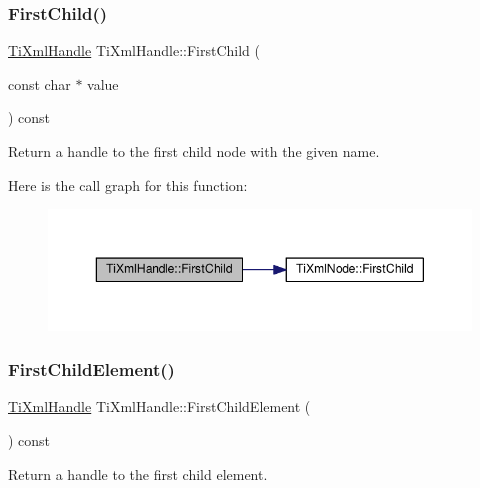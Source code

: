 \subsubsection{\texorpdfstring{First\+Child()}{FirstChild()}\hspace{0.1cm}{\footnotesize\ttfamily [2/2]}}
{\footnotesize\ttfamily \hyperlink{class_ti_xml_handle}{Ti\+Xml\+Handle} Ti\+Xml\+Handle\+::\+First\+Child (\begin{DoxyParamCaption}\item[{const char $\ast$}]{value }\end{DoxyParamCaption}) const}



Return a handle to the first child node with the given name. 

Here is the call graph for this function\+:
\nopagebreak
\begin{figure}[H]
\begin{center}
\leavevmode
\includegraphics[width=350pt]{class_ti_xml_handle_a586ebaca4a4d0909db65a765d95d5e59_cgraph}
\end{center}
\end{figure}
\mbox{\label{class_ti_xml_handle_af0643f8683f3f2b779b8c9d78c67b2c0}} 
\subsubsection{\texorpdfstring{First\+Child\+Element()}{FirstChildElement()}\hspace{0.1cm}{\footnotesize\ttfamily [1/2]}}
{\footnotesize\ttfamily \hyperlink{class_ti_xml_handle}{Ti\+Xml\+Handle} Ti\+Xml\+Handle\+::\+First\+Child\+Element (\begin{DoxyParamCaption}{ }\end{DoxyParamCaption}) const}



Return a handle to the first child element. 

